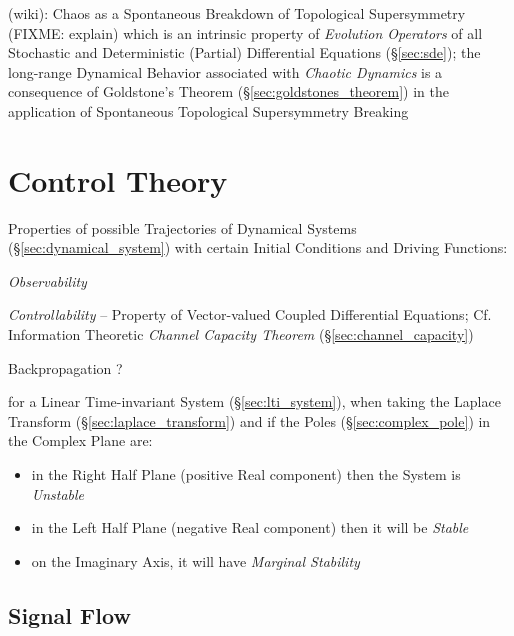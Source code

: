 (wiki): Chaos as a Spontaneous Breakdown of Topological Supersymmetry (FIXME:
explain) which is an intrinsic property of \emph{Evolution Operators} of all
Stochastic and Deterministic (Partial) Differential Equations (\S\ref{sec:sde});
the long-range Dynamical Behavior associated with \emph{Chaotic Dynamics} is a
consequence of Goldstone's Theorem (\S\ref{sec:goldstones_theorem}) in the
application of Spontaneous Topological Supersymmetry Breaking



\section{Control Theory}\label{sec:control_theory}

Properties of possible Trajectories of Dynamical Systems
(\S\ref{sec:dynamical_system}) with certain Initial Conditions and
Driving Functions:

\emph{Observability}

\emph{Controllability} -- Property of Vector-valued Coupled
Differential Equations; \fist Cf. Information Theoretic \emph{Channel
  Capacity Theorem} (\S\ref{sec:channel_capacity})

Backpropagation ?


for a Linear Time-invariant System (\S\ref{sec:lti_system}), when taking the
Laplace Transform (\S\ref{sec:laplace_transform}) and if the Poles
(\S\ref{sec:complex_pole}) in the Complex Plane are:
\begin{itemize}
  \item in the Right Half Plane (positive Real component) then the System is
    \emph{Unstable}
  \item in the Left Half Plane (negative Real component) then it will be
    \emph{Stable}
  \item on the Imaginary Axis, it will have \emph{Marginal Stability}
\end{itemize}



\subsection{Signal Flow}\label{sec:signal_flow}

